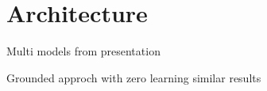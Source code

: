 \chapter{Architecture}
\label{chap:architecture}

Multi models from presentation

Grounded approch with zero learning similar results

